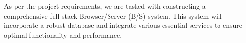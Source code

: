 
As per the project requirements, we are tasked with constructing 
a comprehensive full-stack Browser/Server (B/S) system. 
This system will incorporate a robust database 
and integrate various essential services 
to ensure optimal functionality and performance.